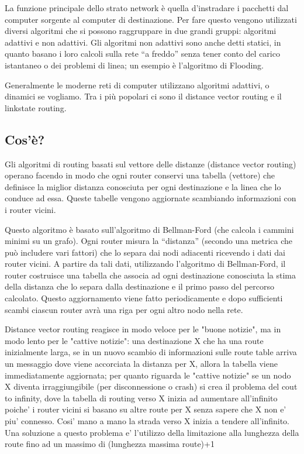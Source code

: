 La funzione principale dello strato network è quella d'instradare i pacchetti dal computer sorgente al computer di destinazione. Per fare questo vengono utilizzati diversi algoritmi che si possono raggruppare in due grandi gruppi: algoritmi adattivi e non adattivi. Gli algoritmi non adattivi sono anche detti statici, in quanto basano i loro calcoli sulla rete “a freddo” senza tener conto del carico istantaneo o dei problemi di linea; un esempio è l'algoritmo di Flooding.

Generalmente le moderne reti di computer utilizzano algoritmi adattivi, o dinamici se vogliamo. Tra i più popolari ci sono il distance vector routing e il linkstate routing.
\subsection{Cos'è?}
Gli algoritmi di routing basati sul vettore delle distanze (distance vector routing) operano facendo in modo che ogni router conservi una tabella (vettore) che definisce la miglior distanza conosciuta per ogni destinazione e la linea che lo conduce ad essa. Queste tabelle vengono aggiornate scambiando informazioni con i router vicini.

Questo algoritmo è basato sull'algoritmo di Bellman-Ford (che calcola i cammini minimi su un grafo).
Ogni router misura la “distanza” (secondo una metrica che può includere vari fattori) che lo separa dai nodi adiacenti ricevendo i dati dai router vicini. A partire da tali dati, utilizzando l'algoritmo di Bellman-Ford, il router costruisce una tabella che associa ad ogni destinazione conosciuta la stima della distanza che lo separa dalla destinazione e il primo passo del percorso calcolato.
Questo aggiornamento viene fatto periodicamente e dopo sufficienti scambi ciascun router avrà una riga per ogni altro nodo nella rete.

Distance vector routing reagisce in modo veloce per le "buone notizie", ma in modo lento per le "cattive notizie": una destinazione X che ha una route inizialmente larga, se in un nuovo scambio di informazioni sulle route table arriva un messaggio dove viene accorciata la distanza per X, allora la tabella viene immediatamente aggiornata; per quanto riguarda le "cattive notizie" se un nodo X diventa irraggiungibile (per disconnessione o crash) si crea il problema del cout to infinity, dove la tabella di routing verso X inizia ad aumentare all'infinito poiche' i router vicini si basano su altre route per X senza sapere che X non e' piu' connesso. Cosi' mano a mano la strada verso X inizia a tendere all'infinito. Una soluzione a questo problema e' l'utilizzo della limitazione alla lunghezza della route fino ad un massimo di (lunghezza massima route)+1

